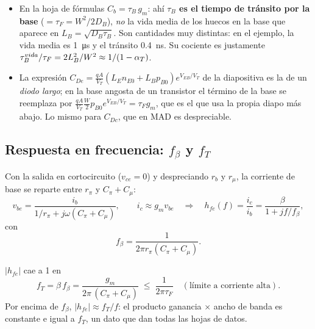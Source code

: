 \begin{ojo}
\begin{itemize}
  \item En la hoja de fórmulas $C_b=\tau_B\,g_m$: ahí \textbf{$\tau_B$ es el tiempo de tránsito
  por la base} ($=\tau_F=W^2/2D_B$), \emph{no} la vida media de los huecos en la base que
  aparece en $L_B=\sqrt{D_B\tau_B}$. Son cantidades muy distintas: en el ejemplo, la vida media
  es \SI{1}{\micro s} y el tránsito \SI{0.4}{ns}. Su cociente es justamente
  $\tau_B^{vida}/\tau_F=2L_B^2/W^2\approx1/(1-\alpha_T)$.
  \item La expresión $C_{De}=\frac{qA}{V_T}(L_En_{E0}+L_Bp_{B0})e^{V_{EB}/V_T}$ de la diapositiva
  es la de un \emph{diodo largo}; en la base angosta de un transistor el término de la base
  se reemplaza por $\frac{qA}{V_T}\frac{W}{2}p_{B0}e^{V_{EB}/V_T}=\tau_Fg_m$, que es el que
  usa la propia diapo más abajo. Lo mismo para $C_{Dc}$, que en MAD es despreciable.
\end{itemize}
\end{ojo}

\subsection{Respuesta en frecuencia: \texorpdfstring{$f_\beta$}{f-beta} y \texorpdfstring{$f_T$}{fT}}

Con la salida en cortocircuito ($v_{ce}=0$) y despreciando $r_b$ y $r_\mu$, la corriente de base
se reparte entre $r_\pi$ y $C_\pi+C_\mu$:
\[
  v_{be} = \frac{i_b}{1/r_\pi+j\omega(C_\pi+C_\mu)},
  \qquad
  i_c \approx g_mv_{be}
  \quad\Longrightarrow\quad
  h_{fe}(f) = \frac{i_c}{i_b} = \frac{\beta}{1+jf/f_\beta},
\]
con
\[
  f_\beta = \frac{1}{2\pi r_\pi(C_\pi+C_\mu)} .
\]

\begin{clave}
$|h_{fe}|$ cae a 1 en
\[
  f_T = \beta\,f_\beta = \frac{g_m}{2\pi\,(C_\pi+C_\mu)}
  \;\le\; \frac{1}{2\pi\tau_F}\quad(\text{límite a corriente alta}).
\]
Por encima de $f_\beta$, $|h_{fe}|\approx f_T/f$: el producto ganancia $\times$ ancho de banda
es constante e igual a $f_T$, un dato que dan todas las hojas de datos.
\end{clave}

